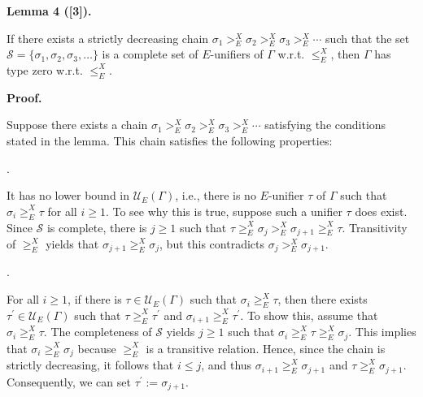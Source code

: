 \documentclass[10pt,a4paper]{amsart}
\begin{document}
 
 
\par\medskip\noindent\textbf{Lemma 4 ([3]).}\par
 
 
If there exists a strictly decreasing chain $\sigma_{1}>_{E}^{X}\sigma_{2}>_{E}^{X}\sigma_{3}>_{E}^{X}\cdots$ such that the set $\mathcal{S}=\{\sigma_{1},\sigma_{2},\sigma_{3},\ldots\}$ is a complete set of $E$-unifiers of $\Gamma$ w.r.t. $\leq_{E}^{X}$, then $\Gamma$ has type zero w.r.t. $\leq_{E}^{X}$.\par
 
 
 
 
\par\medskip\noindent\textbf{Proof.}\par
 
 
Suppose there exists a chain $\sigma_{1}>_{E}^{X}\sigma_{2}>_{E}^{X}\sigma_{3}>_{E}^{X}\cdots$ satisfying the conditions stated in the lemma. This chain satisfies the following properties:\par
  
\par{}. 
 
It has no lower bound in $\mathcal{U}_{E}(\Gamma)$, i.e., there is no $E$-unifier $\tau$ of $\Gamma$ such that $\sigma_{i}\geq_{E}^{X}\tau$ for all $i\geq 1$. To see why this is true, suppose such a unifier $\tau$ does exist. Since $\mathcal{S}$ is complete, there is $j\geq 1$ such that $\tau\geq_{E}^{X}\sigma_{j}>_{E}^{X}\sigma_{j+1}\geq_{E}^{X}\tau$. Transitivity of $\geq_{E}^{X}$ yields that $\sigma_{j+1}\geq_{E}^{X}\sigma_{j}$, but this contradicts $\sigma_{j}>_{E}^{X}\sigma_{j+1}$.\par
 
 
 
\par{}. 
 
For all $i\geq 1$, if there is $\tau\in\mathcal{U}_{E}(\Gamma)$ such that $\sigma_{i}\geq_{E}^{X}\tau$, then there exists $\tau^{\prime}\in\mathcal{U}_{E}(\Gamma)$ such that $\tau\geq_{E}^{X}\tau^{\prime}$ and $\sigma_{i+1}\geq_{E}^{X}\tau^{\prime}$. To show this, assume that $\sigma_{i}\geq_{E}^{X}\tau$. The completeness of $\mathcal{S}$ yields $j\geq 1$ such that $\sigma_{i}\geq_{E}^{X}\tau\geq_{E}^{X}\sigma_{j}$. This implies that $\sigma_{i}\geq_{E}^{X}\sigma_{j}$ because $\geq_{E}^{X}$ is a transitive relation. Hence, since the chain is strictly decreasing, it follows that $i\leq j$, and thus $\sigma_{i+1}\geq_{E}^{X}\sigma_{j+1}$ and $\tau\geq_{E}^{X}\sigma_{j+1}$. Consequently, we can set $\tau^{\prime}:=\sigma_{j+1}$.\par
 
\end{document}
